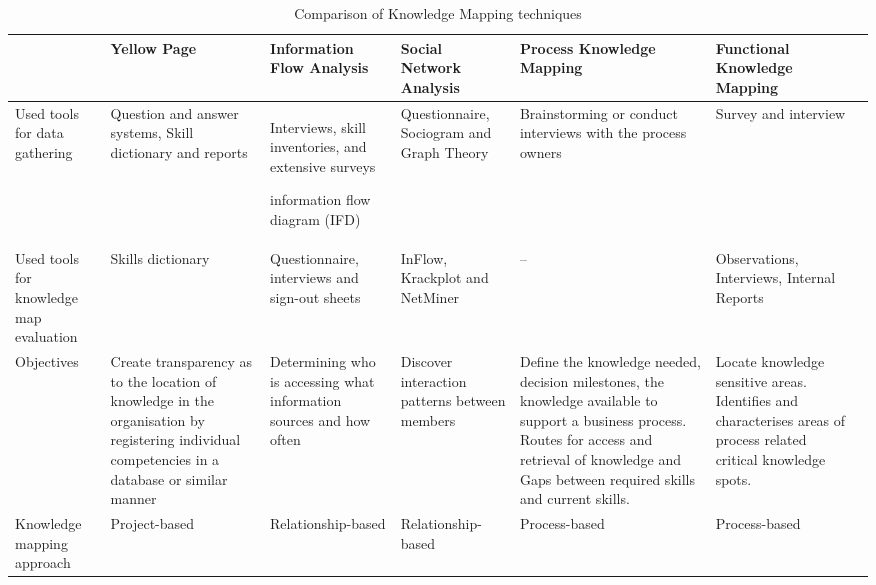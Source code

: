 \documentclass[a4paper, 11pt]{article}
\begin{document}
\begin{table}[t!]
  \caption{Comparison of Knowledge Mapping techniques \parencite{jafari2009}}\label{tbl:km}
  \fontsize{6pt}{6pt}\selectfont
  \centering
  \begin{tabular}{p{} | p{} p{} p{} p{} p{} p{0cm}}
    \toprule
    & 
    \raggedright Yellow Page & 
    \raggedright Information Flow Analysis & 
    \raggedright Social Network Analysis & 
    \raggedright Process Knowledge Mapping & 
    \raggedright Functional Knowledge Mapping & 
    \\
    \midrule
    
    \raggedright Used tools for data gathering &
    \raggedright Question and answer systems, Skill dictionary and reports &
    \raggedright Interviews, skill inventories, and extensive surveys \raggedright information flow diagram (IFD) &
    \raggedright Questionnaire, Sociogram and Graph Theory &
    \raggedright Brainstorming or conduct interviews with the process owners &
    \raggedright Survey and interview &
    \\

    \raggedright Used tools for knowledge map evaluation &
    \raggedright Skills dictionary &
    \raggedright Questionnaire, interviews and sign-out sheets &
    \raggedright InFlow, Krackplot and NetMiner &
    \raggedright -- &
    \raggedright Observations, Interviews, Internal Reports &
    \\

    \raggedright Objectives & 
    \raggedright Create transparency as to the location of knowledge in the organisation by registering individual competencies in a database or similar manner &
    \raggedright Determining who is accessing what information sources and how often &
    \raggedright Discover interaction patterns between members & 
    \raggedright Define the knowledge needed, decision milestones, the knowledge available to support a business process. Routes for access and retrieval of knowledge and Gaps between required skills and current skills. &
    \raggedright Locate knowledge sensitive areas. Identifies and characterises areas of process related critical knowledge spots. &
    \\

    \raggedright Knowledge mapping approach & 
    \raggedright Project-based & 
    \raggedright Relationship-based & 
    \raggedright Relationship-based & 
    \raggedright Process-based & 
    \raggedright Process-based &
    \\


\end{tabular}
\end{table}
\end{document}
